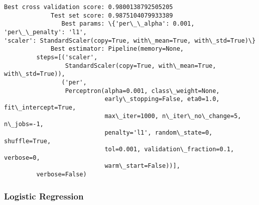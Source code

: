 \documentclass[11pt]{article}
\begin{document}
    \begin{Verbatim}[commandchars=\\\{\}]
Best cross validation score: 0.9800138792505205
             Test set score: 0.9875104079933389
                Best params: \{'per\_\_alpha': 0.001, 'per\_\_penalty': 'l1',
'scaler': StandardScaler(copy=True, with\_mean=True, with\_std=True)\}
             Best estimator: Pipeline(memory=None,
         steps=[('scaler',
                 StandardScaler(copy=True, with\_mean=True, with\_std=True)),
                ('per',
                 Perceptron(alpha=0.001, class\_weight=None,
                            early\_stopping=False, eta0=1.0, fit\_intercept=True,
                            max\_iter=1000, n\_iter\_no\_change=5, n\_jobs=-1,
                            penalty='l1', random\_state=0, shuffle=True,
                            tol=0.001, validation\_fraction=0.1, verbose=0,
                            warm\_start=False))],
         verbose=False)
\end{Verbatim}

    \hypertarget{logistic-regression}{%
\subsubsection{Logistic Regression}\label{logistic-regression}}
\end{document}

